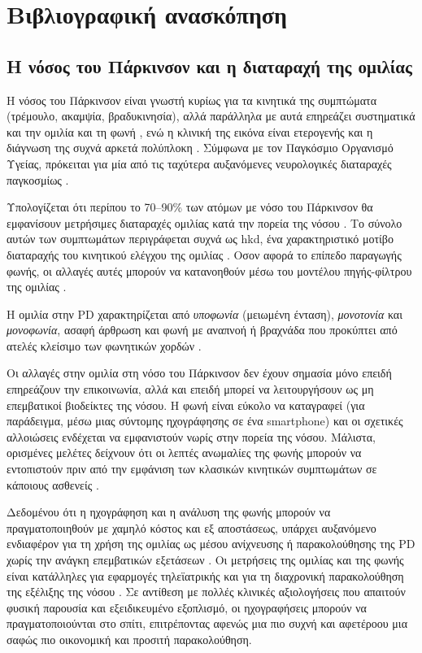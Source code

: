 
\chapter{Βιβλιογραφική ανασκόπηση}
\label{ch:literature-review}

\section{Η νόσος του Πάρκινσον και η διαταραχή της ομιλίας}

Η νόσος του Πάρκινσον είναι γνωστή κυρίως για τα κινητικά της συμπτώματα (τρέμουλο, ακαμψία, βραδυκινησία), 
αλλά παράλληλα με αυτά επηρεάζει συστηματικά και την ομιλία και τη φωνή \citep{kalia2015parkinsons}, 
ενώ η κλινική της εικόνα είναι ετερογενής και η διάγνωση της συχνά αρκετά πολύπλοκη \citep{jankovic2008clinical_features}. 
Σύμφωνα με τον Παγκόσμιο Οργανισμό Υγείας, πρόκειται για μία από τις ταχύτερα αυξανόμενες νευρολογικές διαταραχές παγκοσμίως \citep{who2023parkinsons}. 

Υπολογίζεται ότι περίπου το 70--90\% των ατόμων με νόσο του Πάρκινσον θα εμφανίσουν μετρήσιμες διαταραχές ομιλίας κατά την πορεία της νόσου \citep{ho1999speech}. 
Το σύνολο αυτών των συμπτωμάτων περιγράφεται συχνά ως \gls{hkd}, ένα χαρακτηριστικό μοτίβο διαταραχής του κινητικού ελέγχου της ομιλίας \citep{duffy2012motor}. 
Οσον αφορά το επίπεδο παραγωγής φωνής, οι αλλαγές αυτές μπορούν να κατανοηθούν μέσω του μοντέλου πηγής-φίλτρου της ομιλίας \citep{titze1994principles}.

Η ομιλία στην PD χαρακτηρίζεται από \textit{υποφωνία} (μειωμένη ένταση), \textit{μονοτονία} και \textit{μονοφωνία}, ασαφή άρθρωση και φωνή με αναπνοή ή βραχνάδα 
που προκύπτει από ατελές κλείσιμο των φωνητικών χορδών \citep{ramig2008speech, duffy2012motor}.

Οι αλλαγές στην ομιλία στη νόσο του Πάρκινσον δεν έχουν σημασία μόνο επειδή επηρεάζουν την επικοινωνία, αλλά και επειδή μπορεί να λειτουργήσουν ως μη επεμβατικοί βιοδείκτες της νόσου.
Η φωνή είναι εύκολο να καταγραφεί (για παράδειγμα, μέσω μιας σύντομης ηχογράφησης σε ένα smartphone) και οι σχετικές αλλοιώσεις ενδέχεται να εμφανιστούν νωρίς στην πορεία της νόσου. 
Μάλιστα, ορισμένες μελέτες δείχνουν ότι οι λεπτές ανωμαλίες της φωνής μπορούν να εντοπιστούν πριν από την εμφάνιση των κλασικών κινητικών συμπτωμάτων σε κάποιους ασθενείς \citep{harel2004acoustic}. 

Δεδομένου ότι η ηχογράφηση και η ανάλυση της φωνής μπορούν να πραγματοποιηθούν με χαμηλό κόστος και εξ αποστάσεως, 
υπάρχει αυξανόμενο ενδιαφέρον για τη χρήση της ομιλίας ως μέσου ανίχνευσης ή παρακολούθησης της PD χωρίς την ανάγκη επεμβατικών εξετάσεων \citep{tracy2011investigating}. 
Οι μετρήσεις της ομιλίας και της φωνής είναι κατάλληλες για εφαρμογές τηλεϊατρικής και για τη διαχρονική παρακολούθηση της εξέλιξης της νόσου \citep{tsanas2010accurate}. 
Σε αντίθεση με πολλές κλινικές αξιολογήσεις που απαιτούν φυσική παρουσία και εξειδικευμένο εξοπλισμό, οι ηχογραφήσεις μπορούν να πραγματοποιούνται στο σπίτι, επιτρέποντας αφενώς μια πιο συχνή και αφετέροου μια σαφώς πιο οικονομική και προσιτή παρακολούθηση.

